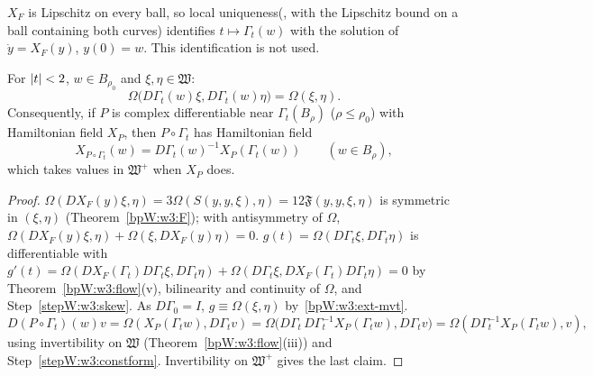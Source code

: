 
\begin{remark}
$X_F$ is Lipschitz on every ball, so local uniqueness\linebreak (, with the
Lipschitz bound on a ball containing both curves) identifies $t\mapsto\Gamma_t(w)$ with the solution of
$\dot y=X_F(y)$, $y(0)=w$. This identification is not used.
\end{remark}

\begin{theorem}\label{bpW:w3:symplectic}
For $\lvert t\rvert<2$, $w\in B_{\rho_0}$ and $\xi,\eta\in\mathfrak W$:
\[\Omega\bigl(D\Gamma_t(w)\xi,D\Gamma_t(w)\eta\bigr)=\Omega(\xi,\eta).\]
Consequently, if $P$ is complex differentiable near $\Gamma_t(B_\rho)$ ($\rho\le\rho_0$) with Hamiltonian field
$X_P$, then $P\circ\Gamma_t$ has Hamiltonian field
\[X_{P\circ\Gamma_t}(w)=D\Gamma_t(w)^{-1}X_P(\Gamma_t(w))\qquad(w\in B_\rho),\]
which takes values in $\mathfrak W^+$ when $X_P$ does.
\end{theorem}

\begin{proof}
\label{stepW:w3:skew}
$\Omega(DX_F(y)\xi,\eta)=3\Omega(S(y,y,\xi),\eta)=12\mathfrak F(y,y,\xi,\eta)$ is symmetric in $(\xi,\eta)$
(Theorem~\ref{bpW:w3:F}); with antisymmetry of $\Omega$,
$\Omega(DX_F(y)\xi,\eta)+\Omega(\xi,DX_F(y)\eta)=0$.
\label{stepW:w3:constform}
$g(t)=\Omega(D\Gamma_t\xi,D\Gamma_t\eta)$ is differentiable with
$g'(t)=\Omega(DX_F(\Gamma_t)D\Gamma_t\xi,D\Gamma_t\eta)+\Omega(D\Gamma_t\xi,DX_F(\Gamma_t)D\Gamma_t\eta)=0$ by
Theorem~\ref{bpW:w3:flow}(v), bilinearity and continuity of $\Omega$, and Step~\ref{stepW:w3:skew}. As
$D\Gamma_0=I$, $g\equiv\Omega(\xi,\eta)$ by~\ref{bpW:w3:ext-mvt}.
\label{stepW:w3:gradtrans}
\[D(P\circ\Gamma_t)(w)v=\Omega(X_P(\Gamma_tw),D\Gamma_tv)=\Omega\bigl(D\Gamma_t\,D\Gamma_t^{-1}X_P(\Gamma_tw),D\Gamma_tv\bigr)
=\Omega(D\Gamma_t^{-1}X_P(\Gamma_tw),v),\]
using invertibility on $\mathfrak W$ (Theorem~\ref{bpW:w3:flow}(iii)) and
Step~\ref{stepW:w3:constform}. Invertibility on $\mathfrak W^+$ gives the last claim.
\end{proof}


